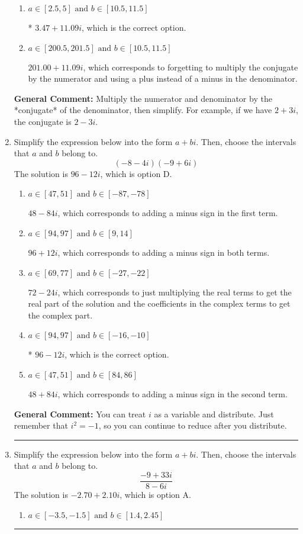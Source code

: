 \documentclass{extbook}[14pt]
\newcommand{\litem}[1]{\item #1

\rule{\textwidth}{0.4pt}}
\begin{document}
\begin{enumerate}
{\begin{enumerate}[label=\Alph*.]
 $3.47  + 643.00 i$, which corresponds to forgetting to multiply the conjugate by the numerator.
\item \( a \in [2.5, 5] \text{ and } b \in [10.5, 11.5] \)

* $3.47  + 11.09 i$, which is the correct option.
\item \( a \in [200.5, 201.5] \text{ and } b \in [10.5, 11.5] \)

 $201.00  + 11.09 i$, which corresponds to forgetting to multiply the conjugate by the numerator and using a plus instead of a minus in the denominator.
\end{enumerate}

\textbf{General Comment:} Multiply the numerator and denominator by the *conjugate* of the denominator, then simplify. For example, if we have $2+3i$, the conjugate is $2-3i$.
}
\litem{
Simplify the expression below into the form $a+bi$. Then, choose the intervals that $a$ and $b$ belong to.
\[ (-8 - 4 i)(-9 + 6 i) \]The solution is \( 96 - 12 i \), which is option D.\begin{enumerate}[label=\Alph*.]
\item \( a \in [47, 51] \text{ and } b \in [-87, -78] \)

 $48 - 84 i$, which corresponds to adding a minus sign in the first term.
\item \( a \in [94, 97] \text{ and } b \in [9, 14] \)

 $96 + 12 i$, which corresponds to adding a minus sign in both terms.
\item \( a \in [69, 77] \text{ and } b \in [-27, -22] \)

 $72 - 24 i$, which corresponds to just multiplying the real terms to get the real part of the solution and the coefficients in the complex terms to get the complex part.
\item \( a \in [94, 97] \text{ and } b \in [-16, -10] \)

* $96 - 12 i$, which is the correct option.
\item \( a \in [47, 51] \text{ and } b \in [84, 86] \)

 $48 + 84 i$, which corresponds to adding a minus sign in the second term.
\end{enumerate}

\textbf{General Comment:} You can treat $i$ as a variable and distribute. Just remember that $i^2=-1$, so you can continue to reduce after you distribute.
}
\litem{
Simplify the expression below into the form $a+bi$. Then, choose the intervals that $a$ and $b$ belong to.
\[ \frac{-9 + 33 i}{8 - 6 i} \]The solution is \( -2.70  + 2.10 i \), which is option A.\begin{enumerate}[label=\Alph*.]
\item \( a \in [-3.5, -1.5] \text{ and } b \in [1.4, 2.45] \)


\end{enumerate}}
\end{enumerate}
\end{document}
